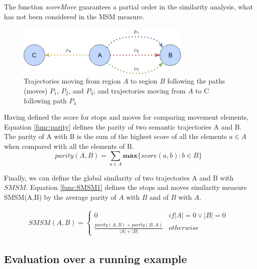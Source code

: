 \documentclass[12pt]{article}
\begin{document}
The function \emph{scoreMove} guarantees a partial order in the similarity analysis, what has not been considered in the MSM measure.

\begin{figure}[h]
\centering
\includegraphics[width=0.75\textwidth]{Images/Toy_trajectories.jpg}
\caption{\label{fig:move} Trajectories moving from region $A$ to region $B$ following the paths (moves) $P_1$, $P_2$, and $P_3$; and trajectories moving from $A$ to C following path $P_4$}
\end{figure}

Having defined the score for stops and moves for comparing movement elements, Equation \ref{func:parity} defines the parity of two semantic trajectories A and B. The parity of A with B is
the sum of the highest score of all the elements $a \in A$ when compared with all the elements of B.
\begin{equation}
\label{func:parity}
parity(A, B) = \sum\limits_{a\in A} \textbf{max}\{\textit{score}(a, b) : b \in B\}
\end{equation}

Finally, we can define the global similarity of two trajectories A and B with $SMSM$. Equation \ref{func:SMSM1} defines the stops and moves similarity measure SMSM(A,B) by the average parity of $A$ with $B$ and of $B$ with $A$.

\begin{equation}
\label{func:SMSM1}
\begin{split}
  SMSM(A, B) = 
  \begin{cases} 
      0 & if  |A| = 0 \vee |B| = 0 \\
      \frac{parity(A, B) + parity(B, A)}{|A| + |B|} & otherwise
  \end{cases}
\end{split}
\end{equation}



\subsection{Evaluation over a running example}
\end{document}

